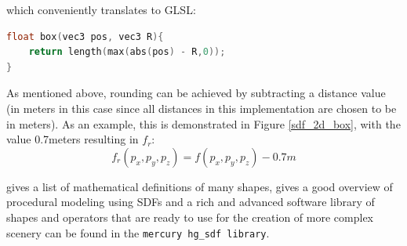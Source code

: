 \documentclass[twoside,a4paper]{article}
\begin{document}
which conveniently translates to GLSL:

\begin{lstlisting}[language=C, caption={\it GLSL code for creating a box SDF},captionpos=b, label=lst:boxSdf]
float box(vec3 pos, vec3 R){
    return length(max(abs(pos) - R,0));
}
\end{lstlisting}
As mentioned above, rounding can be achieved by subtracting a distance value (in meters in this case since all distances in this implementation are chosen to be in meters). As an example, this is demonstrated in Figure \ref{sdf_2d_box}, with the value 0.7meters resulting in $f_r$:
\begin{equation}
f_r(p_x, p_y, p_z) = f(p_x, p_y, p_z)-0.7m
\end{equation}

\cite{hart_sphere_1996} gives a list of mathematical definitions of many shapes, \cite{diener_procedural_2012} gives a good overview of procedural modeling using SDFs and a rich and advanced  software library of shapes and operators that are ready to use for the creation of more complex scenery can be found in the \texttt{mercury hg\_sdf library}\cite{mercury}.
\end{document}
